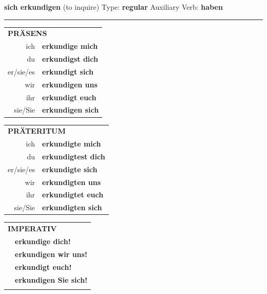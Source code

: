 \documentclass[10pt,a4paper]{revtex4-2}
\begin{document}
\begin{verbbox}
    {\Large \bf sich erkundigen} (to inquire) \hfill Type: \textbf{regular} \hfill Auxiliary Verb: \textbf{haben} 
    
     \vspace{5pt}

    \hrule
    
    \vspace{5pt}

  \begin{tabular}{rl}
     \multicolumn{2}{l}{\textbf{PRÄSENS} }\\
    ich & \textbf{erkundige mich}\\
    du & \textbf{erkundigst dich}\\
    er/sie/es & \textbf{erkundigt sich}\\
    wir & \textbf{erkundigen uns}\\
    ihr & \textbf{erkundigt euch}\\
    sie/Sie & \textbf{erkundigen sich}\\
  \end{tabular}
  \hfill
     \begin{tabular}{rl}
    \multicolumn{2}{l}{\textbf{PRÄTERITUM} }\\
    ich & \textbf{erkundigte mich}\\
    du & \textbf{erkundigtest dich}\\
    er/sie/es & \textbf{erkundigte sich}\\
    wir & \textbf{erkundigten uns}\\
    ihr & \textbf{erkundigtet euch}\\
    sie/Sie & \textbf{erkundigten sich}\\
  \end{tabular}
  \hfill
  \begin{tabular}{rl}
     \multicolumn{2}{l}{\textbf{IMPERATIV} }\\
   & \textbf{erkundige dich!}\\
   & \textbf{erkundigen wir uns!}\\
   & \textbf{erkundigt euch!}\\
   & \textbf{erkundigen Sie sich!}\\
   & \vspace{10pt}
  \end{tabular}

    \vspace{10pt}


\end{verbbox}
\end{document}
